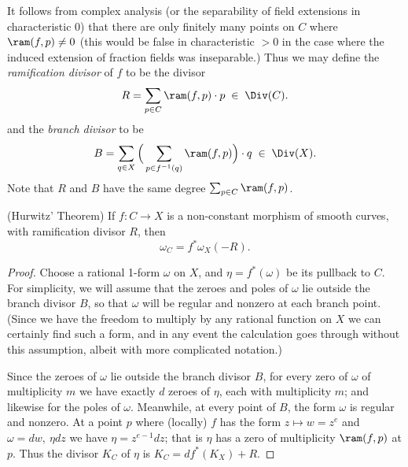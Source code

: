It follows from complex analysis (or the separability of field extensions in characteristic 0) that there are only finitely many
points on $C$ where $\ram(f,p) \neq 0$ (this would be false in characteristic $>0$ in the case where the
induced extension of fraction fields was inseparable.) Thus we may define the \emph{ramification divisor} of $f$ to be the divisor
 $$
 R = \sum_{p \in C} \ram(f,p)\cdot p \; \in \;  \Div(C).
 $$
 and the \emph{branch divisor} to be
 $$
 B = \sum_{q \in X} \Big(\sum_{p \in f^{-1}(q)} \ram(f,p) \Big)\cdot q \; \in \; \Div(X).
 $$
 Note that $R$ and $B$ have the same degree $\sum_{p \in C} \ram(f,p)$. 

 
\begin{theorem}(Hurwitz' Theorem) \cite[****]{H} \label{Hurwitz}
If $f:C\to X$ is a non-constant morphism of smooth curves, with ramification divisor $R$, then 
$$
\omega_{C} = f^{*}\omega_{X}(-R).
$$
\end{theorem}
 
 
\begin{proof}
Choose a rational 1-form $\omega$ on $X$, and $\eta = f^*(\omega)$ be its pullback to $C$. For simplicity, we will assume that the zeroes and poles of $\omega$ lie outside the branch divisor $B$, so that $\omega$ will be regular and nonzero at each branch point. (Since we have the freedom to multiply by any rational function on $X$ we can certainly find such a form, and in any event the calculation goes through without this assumption, albeit with more complicated notation.) 

Since the zeroes of $\omega$ lie outside the branch divisor $B$, for every zero of $\omega$ of multiplicity $m$ we have exactly $d$ zeroes of $\eta$, each with multiplicity $m$; and likewise for the poles of $\omega$. Meanwhile, at every point of $B$, the form $\omega$ is regular and nonzero. At a point $p$ where (locally) $f$ has the form $z \mapsto w = z^{e}$
and $\omega = dw,\ \eta dz$ we have $\eta = z^{e-1}dz$; that is $\eta$ has a zero of multiplicity $\ram(f,p)$ at  $p$.
Thus the divisor $K_{C}$ of $\eta$ is
$K_{C} = df^{*}(K_{X})+R$.
\end{proof}

